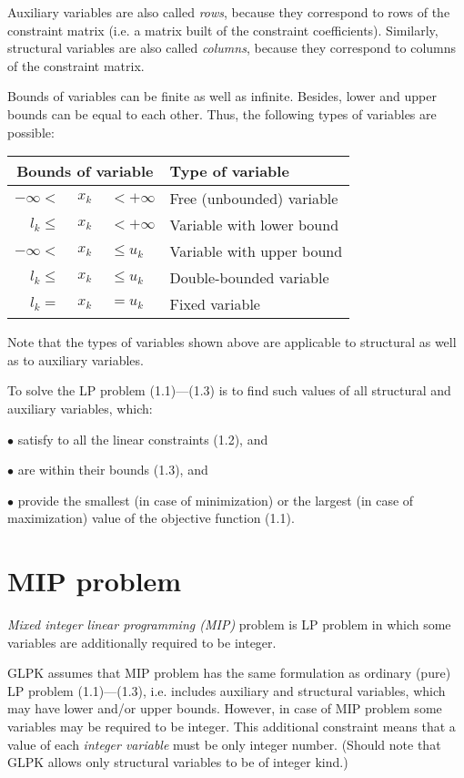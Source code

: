 Auxiliary variables are also called {\it rows}, because they correspond
to rows of the constraint matrix (i.e. a matrix built of the constraint
coefficients). Similarly, structural variables are also called
{\it columns}, because they correspond to columns of the constraint
matrix.

Bounds of variables can be finite as well as infinite. Besides, lower
and upper bounds can be equal to each other. Thus, the following types
of variables are possible:
\begin{center}
\begin{tabular}{r@{}c@{}ll}
\multicolumn{3}{c}{Bounds of variable} & Type of variable \\
\hline
$-\infty <$ &$\ x_k\ $& $< +\infty$ & Free (unbounded) variable \\
$l_k \leq$ &$\ x_k\ $& $< +\infty$  & Variable with lower bound \\
$-\infty <$ &$\ x_k\ $& $\leq u_k$  & Variable with upper bound \\
$l_k \leq$ &$\ x_k\ $& $\leq u_k$   & Double-bounded variable \\
$l_k =$ &$\ x_k\ $& $= u_k$         & Fixed variable \\
\end{tabular}
\end{center}
\noindent
Note that the types of variables shown above are applicable to
structural as well as to auxiliary variables.

To solve the LP problem (1.1)---(1.3) is to find such values of all
structural and auxiliary variables, which:

$\bullet$ satisfy to all the linear constraints (1.2), and

$\bullet$ are within their bounds (1.3), and

$\bullet$ provide the smallest (in case of minimization) or the largest
(in case of maximization) value of the objective function (1.1).

\section{MIP problem}

{\it Mixed integer linear programming (MIP)} problem is LP problem in
which some variables are additionally required to be integer.

GLPK assumes that MIP problem has the same formulation as ordinary
(pure) LP problem (1.1)---(1.3), i.e. includes auxiliary and structural
variables, which may have lower and/or upper bounds. However, in case of
MIP problem some variables may be required to be integer. This
additional constraint means that a value of each {\it integer variable}
must be only integer number. (Should note that GLPK allows only
structural variables to be of integer kind.)


